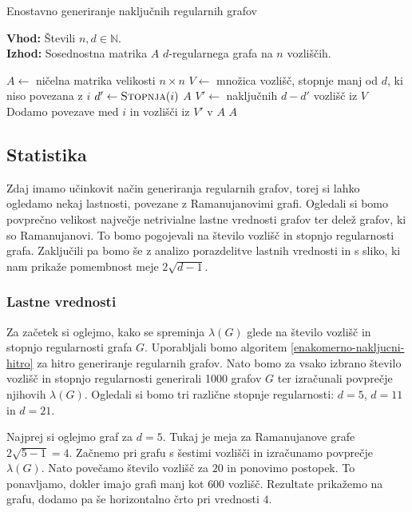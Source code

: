 \begin{algorithm}[t]
    \caption{Enostavno generiranje naključnih regularnih grafov}
    \label{naivno-generiranje-nakljucnih}
    \raggedright
    \textbf{Vhod:} Števili \(n, d \in \mathbb N\). \\
    \textbf{Izhod:} Sosednostna matrika \(A\) \(d\)-regularnega grafa na \(n\) vozliščih.
    \begin{algorithmic}[1]
        \State \(A \gets\) ničelna matrika velikosti \(n \times n\)
        \State \(V \gets \) množica vozlišč, stopnje manj od \(d\), ki niso povezana z \(i\)
        \State \(d' \gets \Call{Stopnja}i\)
        \State \Return \(A\)
        \EndIf
        \State \(V' \gets \) naključnih \(d-d'\) vozlišč iz \(V\)
        \State Dodamo povezave med \(i\) in vozlišči iz \(V'\) v \(A\)
        \EndFor
        \State \Return $A$
        \EndFunction
    \end{algorithmic}
\end{algorithm}

\subsection{Statistika}
Zdaj imamo učinkovit način generiranja regularnih grafov, torej si lahko ogledamo nekaj lastnosti, povezane z Ramanujanovimi grafi. Ogledali si bomo povprečno velikost največje netrivialne lastne vrednosti grafov ter delež grafov, ki so Ramanujanovi. To bomo pogojevali na število vozlišč in stopnjo regularnosti grafa. Zaključili pa bomo še z analizo porazdelitve lastnih vrednosti in s sliko, ki nam prikaže pomembnost meje \(2\sqrt{d-1}\).

\subsubsection{Lastne vrednosti}
Za začetek si oglejmo, kako se spreminja \(\lambda(G)\) glede na število vozlišč in stopnjo regularnosti grafa \(G\). Uporabljali bomo algoritem \ref{enakomerno-nakljucni-hitro} za hitro generiranje regularnih grafov. Nato bomo za vsako izbrano število vozlišč in stopnjo regularnosti generirali 1000 grafov \(G\) ter izračunali povprečje njihovih \(\lambda(G)\). Ogledali si bomo tri različne stopnje regularnosti: \(d=5\), \(d=11\) in \(d=21\).

Najprej si oglejmo graf za \(d=5\). Tukaj je meja za Ramanujanove grafe \(2\sqrt{5-1} = 4\). Začnemo pri grafu s šestimi vozlišči in izračunamo povprečje \(\lambda(G)\). Nato povečamo število vozlišč za \(20\) in ponovimo postopek. To ponavljamo, dokler imajo grafi manj kot \(600\) vozlišč. Rezultate prikažemo na grafu, dodamo pa še horizontalno črto pri vrednosti \(4\).

